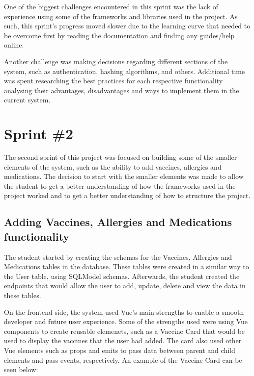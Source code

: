 One of the biggest challenges encountered in this sprint was the lack of experience using some of the frameworks and libraries used in the project. As such, this sprint's progress moved slower due to the learning curve that needed to be overcome first by reading the documentation and finding any guides/help online.

Another challenge was making decisions regarding different sections of the system, such as authentication, hashing algorithms, and others. Additional time was spent researching the best practices for each respective functionality \- analysing their advantages, disadvantages and ways to implement them in the current system.

\section{Sprint \#2}

The second sprint of this project was focused on building some of the smaller elements of the system, such as the ability to add vaccines, allergies and medications. The decision to start with the smaller elements was made to allow the student to get a better understanding of how the frameworks used in the project worked and to get a better understanding of how to structure the project.

\subsection{Adding Vaccines, Allergies and Medications functionality}

The student started by creating the schemas for the Vaccines, Allergies and Medications tables in the database. These tables were created in a similar way to the User table, using SQLModel schemas. Afterwards, the student created the endpoints that would allow the user to add, update, delete and view the data in these tables.

On the frontend side, the system used Vue's main strengths to enable a smooth developer and future user experience. Some of the strengths used were using Vue components to create reusable elemenets, such as a Vaccine Card that would be used to display the vaccines that the user had added. The card also used other Vue elements such as props and emits to pass data between parent and child elements and pass events, respectively. An example of the Vaccine Card can be seen below:

\clearpage

